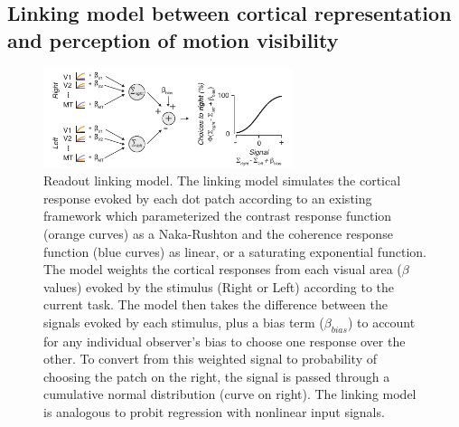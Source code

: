 \subsection{Linking model between cortical representation and perception of motion visibility}

\begin{figure}
\centering
\includegraphics[keepaspectratio,width=0.65\textwidth]{figs_c3/Fig4_linkingmodel.pdf}
\caption[Readout linking model]{Readout linking model. The linking model simulates the cortical response evoked by each dot patch according to an existing framework \citep{Birman2018-sp} which parameterized the contrast response function (orange curves) as a Naka-Rushton and the coherence response function (blue curves) as linear, or a saturating exponential function. The model weights the cortical responses from each visual area ($\beta$ values) evoked by the stimulus (Right or Left) according to the current task. The model then takes the difference between the signals evoked by each stimulus, plus a bias term ($\beta_{bias}$) to account for any individual observer’s bias to choose one response over the other. To convert from this weighted signal to probability of choosing the patch on the right, the signal is passed through a cumulative normal distribution (curve on right). The linking model is analogous to probit regression with nonlinear input signals.}
\label{fig:c3f4}
\end{figure}

